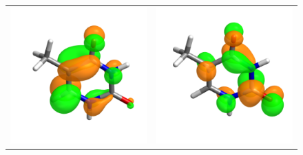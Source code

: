 \documentclass[11.5pt]{article}
\begin{document}
\begin{figure}[!ht]
  \begin{tabular}{ c  c }
  \includegraphics[scale=0.1]{PiStar1.pdf} & \includegraphics[scale=0.1]{PiStar2.pdf} \\

\end{tabular}
\end{figure}
\end{document}
